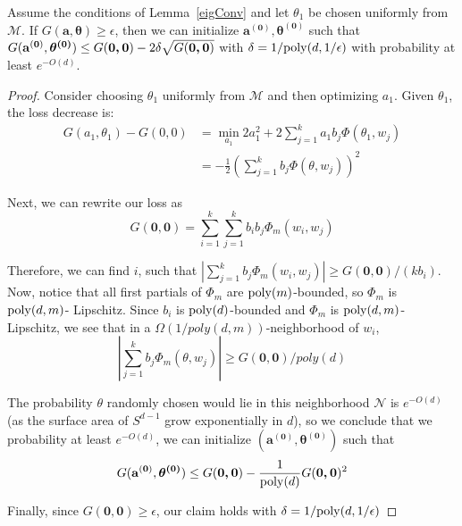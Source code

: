  \begin{lemma}\label{initialize}
Assume the conditions of Lemma~\ref{eigConv} and let $\theta_1$ be chosen uniformly from $\mathcal{M}$. If $G(\boldsymbol{a,\theta}) \geq \epsilon$, then we can initialize $\boldsymbol{a^{(0)},\theta^{(0)}}$ such that $G({\bf a^{(0)}, \boldsymbol{\theta^{(0)}}}) \leq G(\boldsymbol{0,0}) - 2\delta\sqrt{G(\boldsymbol{0,0})}$ with $\delta = 1/\mathrm{poly}(d,1/\epsilon)$ with probability at least $e^{-O(d)}$.
 \end{lemma}
 
 \begin{proof}
  Consider choosing $\theta_1$ uniformly from $\mathcal{M}$ and then
  optimizing $a_1$. Given $\theta_1$, the loss decrease is:
%
\begin{align*}
   G(a_1,\theta_1) - G(0,0) & = \min_{a_1} 2a_1^2 +
  2\sum_{j=1}^k a_1 b_j\Phi(\theta_1,w_j) \\
 & = -\frac{1}{2}\left(  \sum_{j=1}^k b_j
   \Phi(\theta,w_j)\right)^2 
\end{align*}

Next, we can rewrite our loss as
%
\[G(\boldsymbol{0,0}) =  \sum_{i=1}^k\sum_{j=1}^k b_i b_j \Phi_m(w_i, w_j) \]

Therefore, we can find $i$, such that
$|\sum_{j=1}^k b_j \Phi_m(w_i, w_j)| \geq
G(\boldsymbol{0,0})/(kb_i)$. Now, notice that all first partials of $\Phi_m$ are $\mathrm{poly}(m)$-bounded, so $\Phi_m$ is $\mathrm{poly}(d, m)$- Lipschitz. Since $b_i$ is $\mathrm{poly}(d)$-bounded and $\Phi_m$ is $\mathrm{poly}(d,m)$-Lipschitz, we see
that in a $\Omega(1/poly(d,m))$-neighborhood of $w_i$,
%
\[|\sum_{j=1}^k b_j \Phi_m(\theta, w_j)| \geq G(\boldsymbol{0,0})/poly(d) \]

The probability $\theta$ randomly chosen would lie in this
neighborhood $\mathcal{N}$ is $e^{-O(d)}$ (as the surface area of $S^{d-1}$ grow exponentially in $d$), so we conclude that we probability at least $e^{-O(d)}$, we can initialize $(\boldsymbol{a^{(0)},\theta^{(0)}})$ such that 
%
\[G({\bf a^{(0)}, \boldsymbol{\theta^{(0)}}}) \leq G(\boldsymbol{0,0}) - \frac{1}{\mathrm{poly}(d)}G(\boldsymbol{0,0})^2\]

Finally, since $G(\boldsymbol{0,0}) \geq \epsilon$, our claim holds with $\delta = 1/\mathrm{poly}(d,1/\epsilon)$
\end{proof}
%
